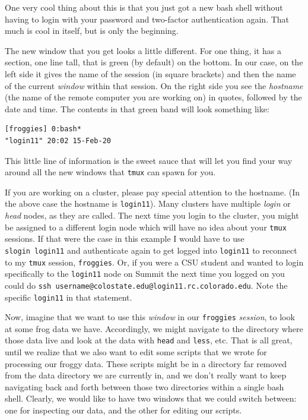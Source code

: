 \documentclass[]{krantz}
\let\BeginKnitrBlock\begin \let\EndKnitrBlock\end
\begin{document}
One very cool thing about this is that you just got a new bash shell
without having to login with your password and two-factor authentication again.
That much is cool in itself, but is only the beginning.

The new window that you get looks a little different. For one thing, it
has a section, one line tall, that is green (by default) on the bottom.
In our case, on the left side it gives the name of the session (in square
brackets) and then the name of the current \emph{window} within that session. On
the right side you see the \emph{hostname} (the name of the remote computer
you are working on) in quotes, followed by the date and time. The contents
in that green band will look something
like:

\begin{verbatim}
[froggies] 0:bash*                                               "login11" 20:02 15-Feb-20
\end{verbatim}

This little line of information is the sweet sauce that will let you
find your way around all the new windows that
\texttt{tmux} can spawn for you.\\
\BeginKnitrBlock{rmdcaution}
If you are working on a cluster, please pay special attention to the hostname.
(In the above case the hostname is \texttt{login11}). Many clusters have multiple \emph{login}
or \emph{head} nodes, as they are called. The next time you login to the cluster, you
might be assigned to a different login node which will have no idea about your
\texttt{tmux} sessions. If that were the case in this example I would have to use \texttt{slogin\ login11} and
authenticate again to get logged into \texttt{login11} to reconnect to my
\texttt{tmux} session, \texttt{froggies}. Or, if you were a CSU student and wanted to login specifically to
the \texttt{login11} node on Summit the next time you logged on you could do
\texttt{ssh\ username@colostate.edu@login11.rc.colorado.edu}. Note the specific \texttt{login11} in that
statement.
\EndKnitrBlock{rmdcaution}

Now, imagine that we want to use this \emph{window} in our \texttt{froggies} \emph{session}, to look at some
frog data we have. Accordingly, we might navigate to the directory where those data live
and look at the data with \texttt{head} and \texttt{less}, etc. That is all great, until we realize that
we also want to edit some scripts that we wrote for processing our froggy data. These scripts
might be in a directory far removed from the data directory we are currently in, and we don't really
want to keep navigating back and forth between those two directories within a single bash shell.
Clearly, we would like to have two windows that we could switch between: one for inspecting
our data, and the other for editing our scripts.
\end{document}
